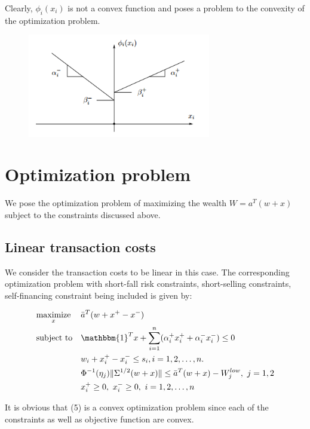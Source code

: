\documentclass[a4paper]{article}
\begin{document}
Clearly, $\phi_i(x_i)$ is not a convex function and poses a problem to the convexity of the optimization problem.

\begin{figure}[h]
\centering
\includegraphics[width=8cm]{img.png}

\end{figure}
\newpage

\section{Optimization problem}
We pose the optimization problem of maximizing the wealth $W=a^T(w+x)$ subject to the constraints discussed above.

\subsection{Linear transaction costs}
We consider the transaction costs to be linear in this case. The corresponding optimization problem with short-fall risk constraints, short-selling constraints, self-financing constraint being included is given by:


\begin{equation}
\begin{aligned}
& \underset{x}{\text{maximize}}
& & \bar{a}^T (w+x^+ - x^-) \\
& \text{subject to}
& & \mathbbm{1}^Tx + \displaystyle \sum_{i=1}^n (\alpha_i^{+}x_i^+ + \alpha_i^{-}x_i^-) \leq 0  \\
& & & w_i +x_i^+ - x_i^-   \leq  s_i,  i=1,2,\ldots,n.\\
& & & \Phi^{-1}(\eta_j)\|\Sigma^{1/2}(w+x)\| \leq \bar{a}^T(w+x)- W_j^{low}, \  j=1,2 \\
& & &   x_i^+ \geq 0,\ x_i^- \geq 0,\ i=1,2,\ldots,n   \\
\end{aligned}
\end{equation}

It is obvious that (5) is a convex optimization problem since each of the constraints as well as objective function are convex.
\end{document}
